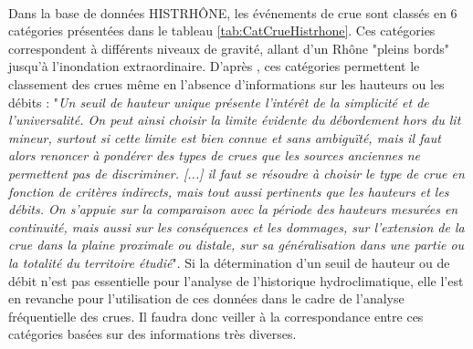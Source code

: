 \documentclass[11pt]{article}
\begin{document}
	\paragraph{} Dans la base de données HISTRHÔNE, les événements de crue sont classés en 6 catégories présentées dans le tableau \ref{tab:CatCrueHistrhone}. Ces catégories correspondent à différents niveaux de gravité, allant d'un Rhône "pleins bords" jusqu'à l'inondation extraordinaire. D'après \citet{pichard_sept_2014}, ces catégories permettent le classement des crues même en l'absence d'informations sur les hauteurs ou les débits : "\textit{Un seuil de hauteur unique présente l'intérêt de la simplicité et de l'universalité. On peut ainsi choisir la limite évidente du débordement hors du lit mineur, surtout si cette limite est bien connue et sans ambiguïté, mais il faut alors renoncer à pondérer des types de crues que les sources anciennes ne permettent pas de discriminer. [...] il faut se résoudre à choisir le type de crue en fonction de critères indirects, mais tout aussi pertinents que les hauteurs et les débits. On s'appuie sur la comparaison avec la période des hauteurs mesurées en continuité, mais aussi sur les conséquences et les dommages, sur l'extension de la crue dans la plaine proximale ou distale, sur sa généralisation dans une partie ou la totalité du territoire étudié}". Si la détermination d'un seuil de hauteur ou de débit n'est pas essentielle pour l'analyse de l'historique hydroclimatique, elle l'est en revanche pour l'utilisation de ces données dans le cadre de l'analyse fréquentielle des crues.  Il faudra donc veiller à la correspondance entre ces catégories basées sur des informations très diverses.
	
\end{document}
